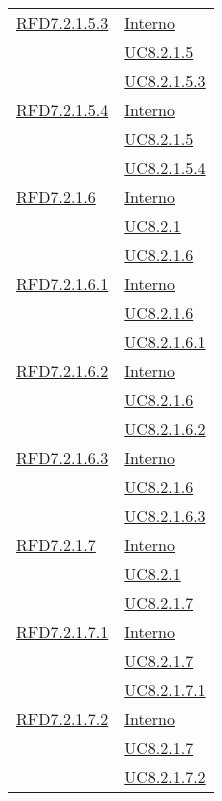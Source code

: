 \begin{longtable}{|>{\centering}m{5cm}|m{5cm}<{\centering}|}
\hyperlink{RFD7.2.1.5.3}{RFD7.2.1.5.3} & \hyperlink{Interno}{Interno}\\
& \hyperref[UC8.2.1.5]{UC8.2.1.5}\\
& \hyperref[UC8.2.1.5.3]{UC8.2.1.5.3}\\ \hline

\hyperlink{RFD7.2.1.5.4}{RFD7.2.1.5.4} & \hyperlink{Interno}{Interno}\\
& \hyperref[UC8.2.1.5]{UC8.2.1.5}\\
& \hyperref[UC8.2.1.5.4]{UC8.2.1.5.4}\\ \hline

\hyperlink{RFD7.2.1.6}{RFD7.2.1.6} & \hyperlink{Interno}{Interno}\\
& \hyperref[UC8.2.1]{UC8.2.1}\\
& \hyperref[UC8.2.1.6]{UC8.2.1.6}\\ \hline

\hyperlink{RFD7.2.1.6.1}{RFD7.2.1.6.1} & \hyperlink{Interno}{Interno}\\
& \hyperref[UC8.2.1.6]{UC8.2.1.6}\\
& \hyperref[UC8.2.1.6.1]{UC8.2.1.6.1}\\ \hline

\hyperlink{RFD7.2.1.6.2}{RFD7.2.1.6.2} & \hyperlink{Interno}{Interno}\\
& \hyperref[UC8.2.1.6]{UC8.2.1.6}\\
& \hyperref[UC8.2.1.6.2]{UC8.2.1.6.2}\\ \hline

\hyperlink{RFD7.2.1.6.3}{RFD7.2.1.6.3} & \hyperlink{Interno}{Interno}\\
& \hyperref[UC8.2.1.6]{UC8.2.1.6}\\
& \hyperref[UC8.2.1.6.3]{UC8.2.1.6.3}\\ \hline

\hyperlink{RFD7.2.1.7}{RFD7.2.1.7} & \hyperlink{Interno}{Interno}\\
& \hyperref[UC8.2.1]{UC8.2.1}\\
& \hyperref[UC8.2.1.7]{UC8.2.1.7}\\ \hline

\hyperlink{RFD7.2.1.7.1}{RFD7.2.1.7.1} & \hyperlink{Interno}{Interno}\\
& \hyperref[UC8.2.1.7]{UC8.2.1.7}\\
& \hyperref[UC8.2.1.7.1]{UC8.2.1.7.1}\\ \hline

\hyperlink{RFD7.2.1.7.2}{RFD7.2.1.7.2} & \hyperlink{Interno}{Interno}\\
& \hyperref[UC8.2.1.7]{UC8.2.1.7}\\
& \hyperref[UC8.2.1.7.2]{UC8.2.1.7.2}\\ \hline


\end{longtable}
